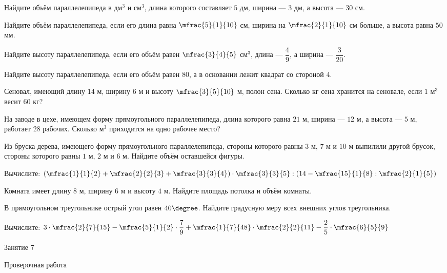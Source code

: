 \begin{class}[number=6]
	\begin{listofex}
		\item Найдите объём  параллелепипеда в дм\(^3\) и см\( ^3 \), длина которого составляет \( 5 \) дм, ширина --- \( 3 \) дм, а высота --- \( 30 \) см.
		\item Найдите объём параллелепипеда, если его длина равна \( \mfrac{5}{1}{10} \) см, ширина на \( \mfrac{2}{1}{10} \) см больше, а высота равна \( 50 \) мм.
		\item Найдите высоту параллелепипеда, если его объём равен \( \mfrac{3}{4}{5} \) см\( ^3 \), длина --- \( \dfrac{4}{9} \), а ширина --- \( \dfrac{3}{20} \).
		\item Найдите высоту параллелепипеда, если его объём равен \( 80 \), а в основании лежит квадрат со стороной \( 4 \).
		\item Сеновал, имеющий длину \( 14 \) м, ширину \( 6 \) м и высоту \( \mfrac{3}{5}{10} \) м, полон сена. Сколько кг сена хранится на сеновале, если \( 1 \) м\( ^3 \) весит \( 60 \) кг?
		\item На заводе в цехе, имеющем форму прямоугольного параллелепипеда, длина которого равна \( 21 \) м, ширина --- \( 12 \) м, а высота --- \( 5 \) м, работает \( 28 \) рабочих. Сколько м\( ^3 \) приходится на одно рабочее место?
		\item Из бруска дерева, имеющего форму прямоугольного параллелепипеда, стороны которого равны \( 3 \) м, \( 7 \) м и \( 10 \) м выпилили другой брусок, стороны которого равны \( 1 \) м, \( 2 \) м и \( 6 \) м. Найдите объём оставшейся фигуры.
		\item Вычислите: \quad \( \left( \mfrac{1}{1}{2}+\mfrac{2}{2}{3}+\mfrac{3}{3}{4} \right)\cdot\mfrac{3}{3}{5}:\left( 14-\mfrac{15}{1}{8}:\mfrac{2}{1}{5} \right) \)
	\end{listofex}
\end{class}

\begin{homework}[number=3]
	\begin{listofex}
		\item Комната имеет длину \( 8 \) м, ширину \( 6 \) м и высоту \( 4 \) м. Найдите площадь потолка и объём комнаты.
		\item В прямоугольном треугольнике острый угол равен \( 40\degree \). Найдите градусную меру всех внешних углов треугольника.
		\item Вычислите: \quad \( 3\cdot\mfrac{2}{7}{15}-\mfrac{5}{1}{2}\cdot\dfrac{7}{9}+\mfrac{1}{7}{48}\cdot\mfrac{2}{2}{11}-\dfrac{2}{5}\cdot\mfrac{6}{5}{9} \)
	\end{listofex}
\end{homework}

\begin{class}[number=7]
	\begin{listofex}
		\item Занятие 7
	\end{listofex}
\end{class}

\begin{exam}
	\begin{listofex}
		\item Проверочная работа
	\end{listofex}
\end{exam}
